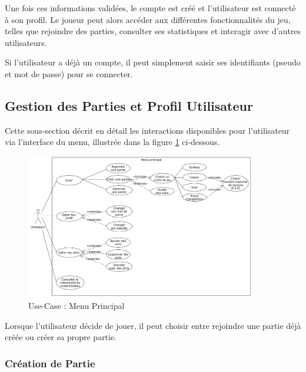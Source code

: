 \documentclass{report}
\begin{document}
\noindent Une fois ces informations validées, le compte est créé et l'utilisateur est connecté à son profil. Le joueur peut alors accéder aux différentes fonctionnalités du jeu, telles que rejoindre des parties, consulter ses statistiques et interagir avec d'autres utilisateurs.

\noindent Si l'utilisateur a déjà un compte, il peut simplement saisir ses identifiants (pseudo et mot de passe) pour se connecter.



\subsection{Gestion des Parties et Profil Utilisateur}

\noindent Cette sous-section décrit en détail les interactions disponibles pour l'utilisateur via l'interface du menu, illustrée dans la figure \ref{fig:use_case_menu} ci-dessous. 

\vspace{-1em}

\begin{figure}[H]
    \centering
     \includegraphics[width=0.9\textwidth, keepaspectratio]{src/user_req/menu.png}
    \caption{Use-Case : Menu Principal}
    \label{fig:use_case_menu}
\end{figure}

\noindent Lorsque l'utilisateur décide de jouer, il peut choisir entre rejoindre une partie déjà créée ou créer sa propre partie.

\subsubsection{Création de Partie}
\end{document}
